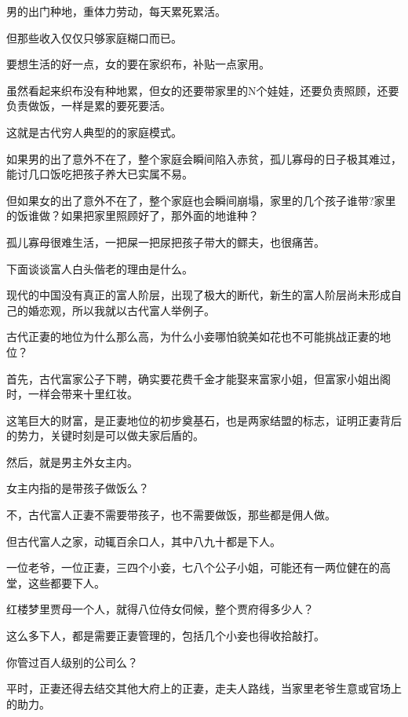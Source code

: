 \documentclass[UTF8,11pt,oneside]{ctexart}
\begin{document}
男的出门种地，重体力劳动，每天累死累活。

但那些收入仅仅只够家庭糊口而已。

要想生活的好一点，女的要在家织布，补贴一点家用。

虽然看起来织布没有种地累，但女的还要带家里的N个娃娃，还要负责照顾，还要负责做饭，一样是累的要死要活。

这就是古代穷人典型的的家庭模式。

如果男的出了意外不在了，整个家庭会瞬间陷入赤贫，孤儿寡母的日子极其难过，能讨几口饭吃把孩子养大已实属不易。

但如果女的出了意外不在了，整个家庭也会瞬间崩塌，家里的几个孩子谁带?家里的饭谁做？如果把家里照顾好了，那外面的地谁种？

孤儿寡母很难生活，一把屎一把尿把孩子带大的鳏夫，也很痛苦。


下面谈谈富人白头偕老的理由是什么。

现代的中国没有真正的富人阶层，出现了极大的断代，新生的富人阶层尚未形成自己的婚恋观，所以我就以古代富人举例子。

古代正妻的地位为什么那么高，为什么小妾哪怕貌美如花也不可能挑战正妻的地位？

首先，古代富家公子下聘，确实要花费千金才能娶来富家小姐，但富家小姐出阁时，一样会带来十里红妆。

这笔巨大的财富，是正妻地位的初步奠基石，也是两家结盟的标志，证明正妻背后的势力，关键时刻是可以做夫家后盾的。

然后，就是男主外女主内。

女主内指的是带孩子做饭么？

不，古代富人正妻不需要带孩子，也不需要做饭，那些都是佣人做。

但古代富人之家，动辄百余口人，其中八九十都是下人。

一位老爷，一位正妻，三四个小妾，七八个公子小姐，可能还有一两位健在的高堂，这些都要下人。

红楼梦里贾母一个人，就得八位侍女伺候，整个贾府得多少人？

这么多下人，都是需要正妻管理的，包括几个小妾也得收拾敲打。

你管过百人级别的公司么？


平时，正妻还得去结交其他大府上的正妻，走夫人路线，当家里老爷生意或官场上的助力。
\end{document}
